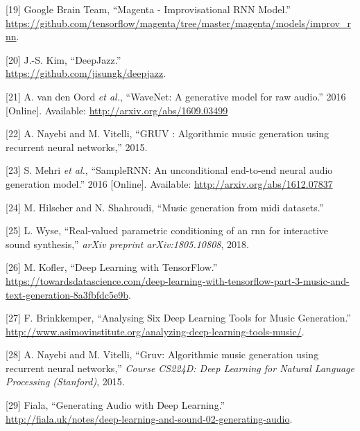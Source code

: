 \documentclass[12pt,]{article}
\begin{document}
\leavevmode\hypertarget{ref-magentaimprov}{}%
{[}19{]} \relax Google Brain Team, ``Magenta - Improvisational RNN
Model.'' \\
\url{https://github.com/tensorflow/magenta/tree/master/magenta/models/improv_rnn}.

\leavevmode\hypertarget{ref-deepjazz}{}%
{[}20{]} J.-S. Kim, ``DeepJazz.'' \\
\url{https://github.com/jisungk/deepjazz}.

\leavevmode\hypertarget{ref-oord2016wavenet}{}%
{[}21{]} A. van den Oord \emph{et al.}, ``WaveNet: A generative model
for raw audio.'' 2016 {[}Online{]}. Available:
\url{http://arxiv.org/abs/1609.03499}

\leavevmode\hypertarget{ref-Nayebi2015GRUVA}{}%
{[}22{]} A. Nayebi and M. Vitelli, ``GRUV : Algorithmic music generation
using recurrent neural networks,'' 2015.

\leavevmode\hypertarget{ref-mehri2016samplernn}{}%
{[}23{]} S. Mehri \emph{et al.}, ``SampleRNN: An unconditional
end-to-end neural audio generation model.'' 2016 {[}Online{]}.
Available: \url{http://arxiv.org/abs/1612.07837}

\leavevmode\hypertarget{ref-hilschermusic}{}%
{[}24{]} M. Hilscher and N. Shahroudi, ``Music generation from midi
datasets.''

\leavevmode\hypertarget{ref-wyse2018real}{}%
{[}25{]} L. Wyse, ``Real-valued parametric conditioning of an rnn for
interactive sound synthesis,'' \emph{arXiv preprint arXiv:1805.10808},
2018.

\leavevmode\hypertarget{ref-mkofler}{}%
{[}26{]} M. Kofler, ``Deep Learning with TensorFlow.'' \\
\url{https://towardsdatascience.com/deep-learning-with-tensorflow-part-3-music-and-text-generation-8a3fbfdc5e9b}.

\leavevmode\hypertarget{ref-asimovinst}{}%
{[}27{]} F. Brinkkemper, ``Analysing Six Deep Learning Tools for Music
Generation.'' \\
\url{http://www.asimovinstitute.org/analyzing-deep-learning-tools-music/}.

\leavevmode\hypertarget{ref-nayebi2015gruv}{}%
{[}28{]} A. Nayebi and M. Vitelli, ``Gruv: Algorithmic music generation
using recurrent neural networks,'' \emph{Course CS224D: Deep Learning
for Natural Language Processing (Stanford)}, 2015.

\leavevmode\hypertarget{ref-fiala}{}%
{[}29{]} \relax Fiala, ``Generating Audio with Deep Learning.'' \\
\url{http://fiala.uk/notes/deep-learning-and-sound-02-generating-audio}.
\end{document}
